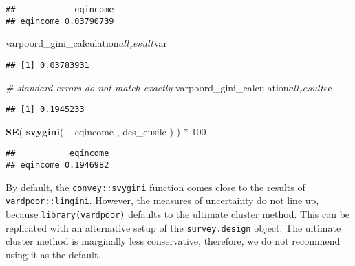 \documentclass[]{book}
\newenvironment{Shaded}{\begin{snugshade}}{\end{snugshade}}
\newcommand{\KeywordTok}[1]{\textcolor[rgb]{0.13,0.29,0.53}{\textbf{{#1}}}}
\newcommand{\DecValTok}[1]{\textcolor[rgb]{0.00,0.00,0.81}{{#1}}}
\newcommand{\StringTok}[1]{\textcolor[rgb]{0.31,0.60,0.02}{{#1}}}
\newcommand{\CommentTok}[1]{\textcolor[rgb]{0.56,0.35,0.01}{\textit{{#1}}}}
\newcommand{\NormalTok}[1]{{#1}}
\begin{document}
\begin{verbatim}
##            eqincome
## eqincome 0.03790739
\end{verbatim}

\begin{Shaded}
\begin{Highlighting}[]
\NormalTok{varpoord_gini_calculation$all_result$var}
\end{Highlighting}
\end{Shaded}

\begin{verbatim}
## [1] 0.03783931
\end{verbatim}

\begin{Shaded}
\begin{Highlighting}[]
\CommentTok{# standard errors do not match exactly}
\NormalTok{varpoord_gini_calculation$all_result$se}
\end{Highlighting}
\end{Shaded}

\begin{verbatim}
## [1] 0.1945233
\end{verbatim}

\begin{Shaded}
\begin{Highlighting}[]
\KeywordTok{SE}\NormalTok{( }\KeywordTok{svygini}\NormalTok{( ~}\StringTok{ }\NormalTok{eqincome , des_eusilc ) ) *}\StringTok{ }\DecValTok{100}
\end{Highlighting}
\end{Shaded}

\begin{verbatim}
##           eqincome
## eqincome 0.1946982
\end{verbatim}

By default, the \texttt{convey::svygini} function comes close to the
results of \texttt{vardpoor::lingini}. However, the measures of
uncertainty do not line up, because \texttt{library(vardpoor)} defaults
to the ultimate cluster method. This can be replicated with an
alternative setup of the \texttt{survey.design} object. The ultimate
cluster method is marginally less conservative, therefore, we do not
recommend using it as the default.
\end{document}
